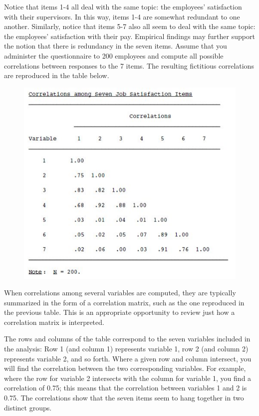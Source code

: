 Notice that items 1-4 all deal with the same topic: the employees’ satisfaction with their supervisors. In this way, items 1-4 are somewhat redundant to one another. Similarly, notice that items 5-7 also all seem to deal
with the same topic: the employees’ satisfaction with their pay. Empirical findings may further support the notion that there is redundancy in the seven items. Assume that you administer the questionnaire to 200 employees and compute all possible correlations between responses to the 7 items. The resulting fictitious correlations are
reproduced in the table below.

\begin{figure}
	\centering
	\includegraphics[width=0.7\linewidth]{3Acorrelation}
	\caption{}
	\label{fig:3acorrelation}
\end{figure}


When correlations among several variables are computed, they are typically summarized in the
form of a correlation matrix, such as the one reproduced in the previous table. This is an appropriate
opportunity to review just how a correlation matrix is interpreted.

The rows and columns of the table correspond to the seven variables included in the analysis: Row 1 (and column 1)
represents variable 1, row 2 (and column 2) represents variable 2, and so forth. Where a given
row and column intersect, you will find the correlation between the two corresponding variables.
For example, where the row for variable 2 intersects with the column for variable 1, you find a
correlation of 0.75; this means that the correlation between variables 1 and 2 is 0.75.
The correlations show that the seven items seem to hang together in two distinct
groups.

